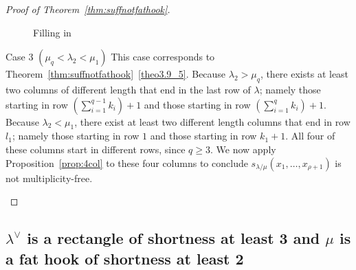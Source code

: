 \begin{proof}[Proof of Theorem~\ref{thm:suffnotfathook}]
\begin{Case}
\begin{figure}[htb]
 \caption[Filling in Case 2.4]{Filling in }
 \label{case2d}
\end{figure}

\end{Case}

\begin{Case}
{Case 3 $(\mu_q < \lambda_2 < \mu_1)$} 
This case corresponds to Theorem~\ref{thm:suffnotfathook}~\ref{theo3.9_5}. Because $\lambda_2 > \mu_q$, there exists at least two columns of different length that end in the last row of $\lambda$; namely those starting in row $(\sum_{i=1}^{q-1} k_i) + 1$ and those starting in row $(\sum_{i=1}^{q} k_i) + 1$. Because $\lambda_2 < \mu_1$, there exist at least two different length columns that end in row $l_1$; namely those starting in row $1$ and those starting in row $k_1+1$. All four of these columns start in different rows, since $q\geq 3$. We now apply Proposition~\ref{prop:4col} to these four columns to conclude $s_{\lambda/\mu}(x_1,\dots, x_{\rho+1})$ is not multiplicity-free. \qedhere
\end{Case}
\end{proof}


\subsection{\texorpdfstring{$\lambda^\vee$}{lambda vee} is a rectangle of shortness at least 3 and \texorpdfstring{$\mu$}{mu} is a fat hook of shortness at least 2}\label{sec:3.3}

